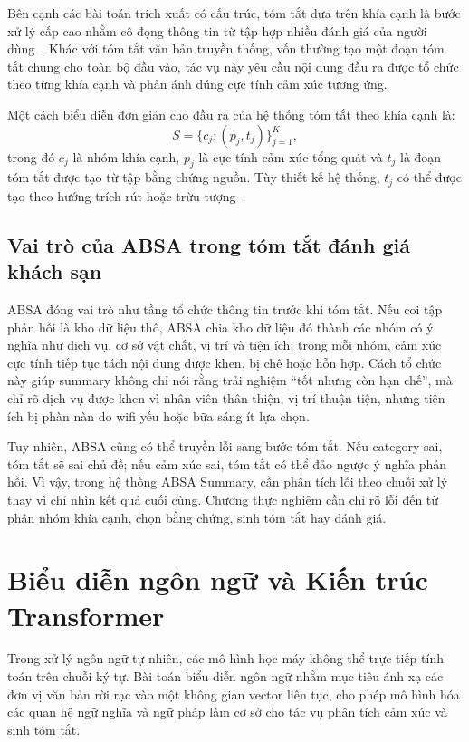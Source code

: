 Bên cạnh các bài toán trích xuất có cấu trúc, tóm tắt dựa trên khía cạnh là bước xử lý cấp cao nhằm cô đọng thông tin từ tập hợp nhiều đánh giá của người dùng~\cite{angelidis2021extractive}. Khác với tóm tắt văn bản truyền thống, vốn thường tạo một đoạn tóm tắt chung cho toàn bộ đầu vào, tác vụ này yêu cầu nội dung đầu ra được tổ chức theo từng khía cạnh và phản ánh đúng cực tính cảm xúc tương ứng.

Một cách biểu diễn đơn giản cho đầu ra của hệ thống tóm tắt theo khía cạnh là:
\begin{equation}
S = \{c_j : (p_j, t_j)\}_{j=1}^{K},
\label{eq:chap2-aspect-summary-output}
\end{equation}
trong đó $c_j$ là nhóm khía cạnh, $p_j$ là cực tính cảm xúc tổng quát và $t_j$ là đoạn tóm tắt được tạo từ tập bằng chứng nguồn. Tùy thiết kế hệ thống, $t_j$ có thể được tạo theo hướng trích rút hoặc trừu tượng~\cite{amplayo2021aspect}.

\subsection{Vai trò của ABSA trong tóm tắt đánh giá khách sạn}
\label{subsec:chap2-absa-summary-role}

ABSA đóng vai trò như tầng tổ chức thông tin trước khi tóm tắt. Nếu coi tập phản hồi là kho dữ liệu thô, ABSA chia kho dữ liệu đó thành các nhóm có ý nghĩa như dịch vụ, cơ sở vật chất, vị trí và tiện ích; trong mỗi nhóm, cảm xúc cực tính tiếp tục tách nội dung được khen, bị chê hoặc hỗn hợp. Cách tổ chức này giúp summary không chỉ nói rằng trải nghiệm ``tốt nhưng còn hạn chế'', mà chỉ rõ dịch vụ được khen vì nhân viên thân thiện, vị trí thuận tiện, nhưng tiện ích bị phàn nàn do wifi yếu hoặc bữa sáng ít lựa chọn.

Tuy nhiên, ABSA cũng có thể truyền lỗi sang bước tóm tắt. Nếu category sai, tóm tắt sẽ sai chủ đề; nếu cảm xúc sai, tóm tắt có thể đảo ngược ý nghĩa phản hồi. Vì vậy, trong hệ thống ABSA Summary, cần phân tích lỗi theo chuỗi xử lý thay vì chỉ nhìn kết quả cuối cùng. Chương thực nghiệm cần chỉ rõ lỗi đến từ phân nhóm khía cạnh, chọn bằng chứng, sinh tóm tắt hay đánh giá.

\section{Biểu diễn ngôn ngữ và Kiến trúc Transformer}
\label{sec:dev-chap2-transformer}

Trong xử lý ngôn ngữ tự nhiên, các mô hình học máy không thể trực tiếp tính toán trên chuỗi ký tự. Bài toán biểu diễn ngôn ngữ nhằm mục tiêu ánh xạ các đơn vị văn bản rời rạc vào một không gian vector liên tục, cho phép mô hình hóa các quan hệ ngữ nghĩa và ngữ pháp làm cơ sở cho tác vụ phân tích cảm xúc và sinh tóm tắt.

